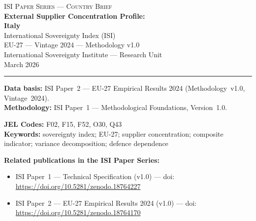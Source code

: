 \documentclass[12pt,a4paper]{article}
\begin{document}
\hypersetup{pageanchor=false}

\begin{titlepage}
\centering
\vspace*{2cm}
{\Large\textsc{ISI Paper Series --- Country Brief}}\\[1.2cm]
{\LARGE\bfseries External Supplier Concentration Profile:\\[0.3em]
Italy}\\[1.5cm]
{\large International Sovereignty Index (ISI)\\[0.3em]
EU-27 --- Vintage 2024 --- Methodology v1.0}\\[1.2cm]
{\large International Sovereignty Institute --- Research Unit}\\[0.8cm]
{\large March 2026}

\vspace{0.8cm}
\noindent\rule{\textwidth}{0.4pt}
\vspace{0.4cm}

\begin{flushleft}
\noindent\textbf{Data basis:} ISI Paper~2 --- EU-27 Empirical Results 2024 (Methodology~v1.0, Vintage~2024).\\[4pt]
\noindent\textbf{Methodology:} ISI Paper~1 --- Methodological Foundations, Version~1.0.

\medskip

\noindent\textbf{JEL Codes:} F02, F15, F52, O30, Q43\\[4pt]
\noindent\textbf{Keywords:} sovereignty index; EU-27; supplier concentration; composite indicator; variance decomposition; defence dependence

\medskip

\noindent\textbf{Related publications in the ISI Paper Series:}
\begin{itemize}[nosep,leftmargin=1.5em]
\item ISI Paper~1 --- Technical Specification (v1.0) --- doi:\\
  \url{https://doi.org/10.5281/zenodo.18764227}
\item ISI Paper~2 --- EU-27 Empirical Results 2024 (v1.0) --- doi:\\
  \url{https://doi.org/10.5281/zenodo.18764170}
\end{itemize}
\end{flushleft}
\vfill
\end{titlepage}
\end{document}
